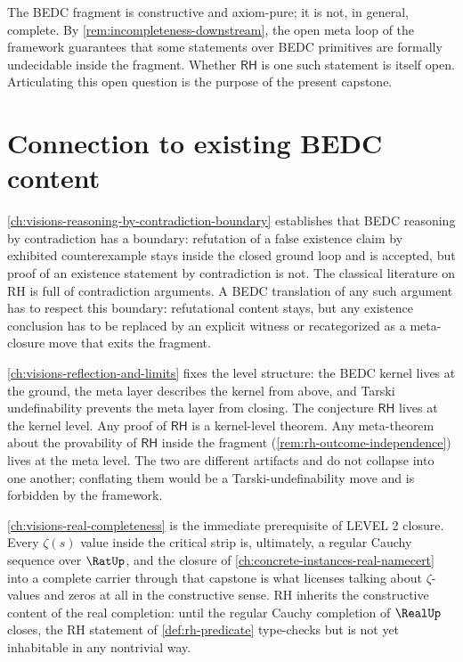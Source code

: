 \begin{remark}
\label{rem:rh-fragment-undecided}
The BEDC fragment is constructive and axiom-pure; it is not, in general, complete. By \autoref{rem:incompleteness-downstream}, the open meta loop of the framework guarantees that some statements over BEDC primitives are formally undecidable inside the fragment. Whether $\mathsf{RH}$ is one such statement is itself open. Articulating this open question is the purpose of the present capstone.
\end{remark}

\section{Connection to existing BEDC content}
\label{sec:rh-connections}

\begin{remark}
\label{rem:rh-reasoning-by-contradiction}
\autoref{ch:visions-reasoning-by-contradiction-boundary} establishes that BEDC reasoning by contradiction has a boundary: refutation of a false existence claim by exhibited counterexample stays inside the closed ground loop and is accepted, but proof of an existence statement by contradiction is not. The classical literature on RH is full of contradiction arguments. A BEDC translation of any such argument has to respect this boundary: refutational content stays, but any existence conclusion has to be replaced by an explicit witness or recategorized as a meta-closure move that exits the fragment.
\end{remark}

\begin{remark}
\label{rem:rh-reflection}
\autoref{ch:visions-reflection-and-limits} fixes the level structure: the BEDC kernel lives at the ground, the meta layer describes the kernel from above, and Tarski undefinability prevents the meta layer from closing. The conjecture $\mathsf{RH}$ lives at the kernel level. Any proof of $\mathsf{RH}$ is a kernel-level theorem. Any meta-theorem about the provability of $\mathsf{RH}$ inside the fragment (\autoref{rem:rh-outcome-independence}) lives at the meta level. The two are different artifacts and do not collapse into one another; conflating them would be a Tarski-undefinability move and is forbidden by the framework.
\end{remark}

\begin{remark}
\label{rem:rh-real-completeness}
\autoref{ch:visions-real-completeness} is the immediate prerequisite of LEVEL 2 closure. Every $\zeta(s)$ value inside the critical strip is, ultimately, a regular Cauchy sequence over $\RatUp$, and the closure of \autoref{ch:concrete-instances-real-namecert} into a complete carrier through that capstone is what licenses talking about $\zeta$-values and zeros at all in the constructive sense. RH inherits the constructive content of the real completion: until the regular Cauchy completion of $\RealUp$ closes, the RH statement of \autoref{def:rh-predicate} type-checks but is not yet inhabitable in any nontrivial way.
\end{remark}

